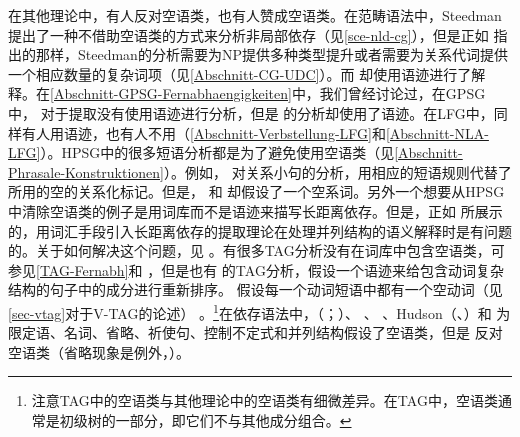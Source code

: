 在其他理论中，有人反对空语类，也有人赞成空语类。在范畴语法\indexcgc 中，Steedman提出了一种不借助空语类的方式来分析非局部依存（见\ref{sce-nld-cg}），但是正如 \citet{Pollard88a}指出的那样，Steedman的分析需要为NP提供多种类型提升或者需要为关系代词提供一个相应数量的复杂词项（见\ref{Abschnitt-CG-UDC}）。而 \citet{KoenigE99a-u}却使用语迹进行了解释。在\ref{Abschnitt-GPSG-Fernabhaengigkeiten}中，我们曾经讨论过，在GPSG\indexgpsgc 中， \citet[--77]{Uszkoreit87a}对于提取没有使用语迹进行分析，但是 \citet*[]{GKPS85a}的分析却使用了语迹。在LFG\indexlfgc 中，同样有人用语迹\citep[]{Bresnan2001a}，也有人不用（\ref{Abschnitt-Verbstellung-LFG}和\ref{Abschnitt-NLA-LFG}）。HPSG\indexhpsgc 中的很多短语分析都是为了避免使用空语类（见\ref{Abschnitt-Phrasale-Konstruktionen}）。例如， \citet{Sag97a}对关系小句的分析，用相应的短语规则代替了 所用的空的关系化标记。但是， 和 却假设了一个空系词。另外一个想要从HPSG中清除空语类的例子是用词库而不是语迹来描写长距离依存\citep*{BMS2001a}。但是，正如  \citet{LH2006a}所展示的，用词汇手段引入长距离依存的提取理论在处理并列结构的语义解释时是有问题的。关于如何解决这个问题，见 。有很多TAG分析\indextagc 没有在词库中包含空语类，可参见\ref{TAG-Fernabh}和 ，但是也有 \citet[]{Kallmeyer2005a-u}的TAG分析，假设一个语迹来给包含动词复杂结构的句子中的成分进行重新排序。 \citet[--11]{Rambow94a}假设每一个动词短语中都有一个空动词（见\ref{sec-vtag}对于V-TAG的论述） 。\footnote{%
注意TAG中的空语类与其他理论中的空语类有细微差异。在TAG中，空语类通常是初级树的一部分，即它们不与其他成分组合。  
}在依存语法中，\mel （\citeyear[]{Melcuk88a-u}；\citeyear[]{Melcuk2003a-u}）、 \citet[]{Starosta88a-u}、 \citet[--472]{Eroms2000a}、Hudson（\citeyear[\S~3.7]{Hudson2007a-u}、\citeyear[]{Hudson2010b-u}）和 \citet{Engel2014a}为限定语、名词、省略、祈使句、控制不定式和并列结构假设了空语类，但是 \citet[]{GO2009a}反对空语类（省略现象是例外，\citealp{Osborne2016a-u}）。
